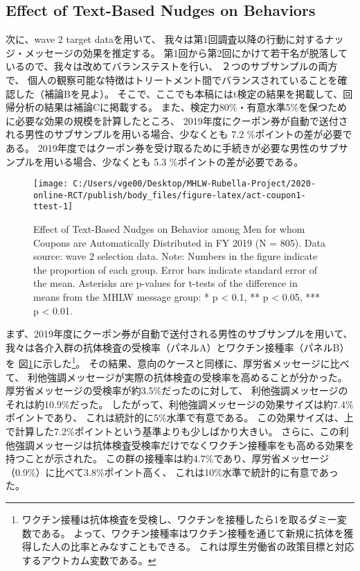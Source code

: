 \documentclass[
  11pt,
  a4paper,
]{article}
\begin{document}
\hypertarget{behavior}{%
\subsection{Effect of Text-Based Nudges on Behaviors}\label{behavior}}

次に、wave 2 target dataを用いて、
我々は第1回調査以降の行動に対するナッジ・メッセージの効果を推定する。
第1回から第2回にかけて若干名が脱落しているので、我々は改めてバランステストを行い、
２つのサブサンプルの両方で、
個人の観察可能な特徴はトリートメント間でバランスされていることを確認した（補論Bを見よ）。
そこで、ここでも本稿にはt検定の結果を掲載して、回帰分析の結果は補論Cに掲載する。
また、検定力80\%・有意水準5\%を保つために必要な効果の規模を計算したところ、
2019年度にクーポン券が自動で送付される男性のサブサンプルを用いる場合、少なくとも
7.2
\%ポイントの差が必要である。
2019年度ではクーポン券を受け取るために手続きが必要な男性のサブサンプルを用いる場合、少なくとも
5.3
\%ポイントの差が必要である。

\begin{figure}[t]
\texttt{[image: C:/Users/vge00/Desktop/MHLW-Rubella-Project/2020-online-RCT/publish/body\_files/figure-latex/act-coupon1-ttest-1]} \caption{Effect of Text-Based Nudges on Behavior among Men for whom Coupons are Automatically Distributed in FY 2019 (N = 805). Data source: wave 2 selection data. Note: Numbers in the figure indicate the proportion of each group. Error bars indicate standard error of the mean. Asterisks are p-values for t-tests of the difference in means from the MHLW message group: * p < 0.1, ** p < 0.05, *** p < 0.01.}\label{fig:act-coupon1-ttest}
\end{figure}

まず、2019年度にクーポン券が自動で送付される男性のサブサンプルを用いて、
我々は各介入群の抗体検査の受検率（パネルA）とワクチン接種率（パネルB）を
図\ref{fig:act-coupon1-ttest}に示した\footnote{ワクチン接種は抗体検査を受検し、ワクチンを接種したら1を取るダミー変数である。
  よって、ワクチン接種率はワクチン接種を通じて新規に抗体を獲得した人の比率とみなすこともできる。
  これは厚生労働省の政策目標と対応するアウトカム変数である。}。
その結果、意向のケースと同様に、厚労省メッセージに比べて、
利他強調メッセージが実際の抗体検査の受検率を高めることが分かった。
厚労省メッセージの受検率が約3.5\%だったのに対して、
利他強調メッセージのそれは約10.9\%だった。
したがって、利他強調メッセージの効果サイズは約7.4\%ポイントであり、
これは統計的に5\%水準で有意である。
この効果サイズは、上で計算した7.2\%ポイントという基準よりも少しばかり大きい。
さらに、この利他強調メッセージは抗体検査受検率だけでなくワクチン接種率をも高める効果を持つことが示された。
この群の接種率は約4.7\%であり、厚労省メッセージ（0.9\%）に比べて3.8\%ポイント高く、
これは10\%水準で統計的に有意であった。
\end{document}

